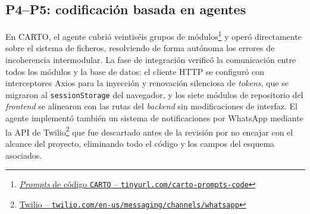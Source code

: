 \subsection{P4--P5: codificación basada en agentes}

En \ac{CARTO}, el agente cubrió veintiséis grupos de módulos\footnote{\href{https://github.com/alu0101549491/TFG-Fabian-Gonzalez-Lence/tree/main/resources/prompts/4-CartographicProjectManager/3-CodigoPorGruposdeModulos}{\textit{Prompts} de código \texttt{CARTO} -- \texttt{tinyurl.com/carto-prompts-code}}} y operó directamente sobre el sistema de ficheros, resolviendo de forma autónoma los errores de incoherencia intermodular. La fase de integración verificó la comunicación entre todos los módulos y la base de datos: el cliente HTTP se configuró con interceptores Axios para la inyección y renovación silenciosa de \textit{tokens}, que se migraron al \texttt{sessionStorage} del navegador, y los siete módulos de repositorio del \textit{frontend} se alinearon con las rutas del \textit{backend} sin modificaciones de interfaz. El agente implementó también un sistema de notificaciones por WhatsApp mediante la \ac{API} de Twilio\footnote{\href{https://www.twilio.com/en-us/messaging/channels/whatsapp?cq_plac=&cq_net=g&cq_pos=&cq_med=&cq_plt=gp&gad_campaignid=23476018559}{Twilio -- \texttt{twilio.com/en-us/messaging/channels/whatsapp}}} que fue descartado antes de la revisión por no encajar con el alcance del proyecto, eliminando todo el código y los campos del esquema asociados.

